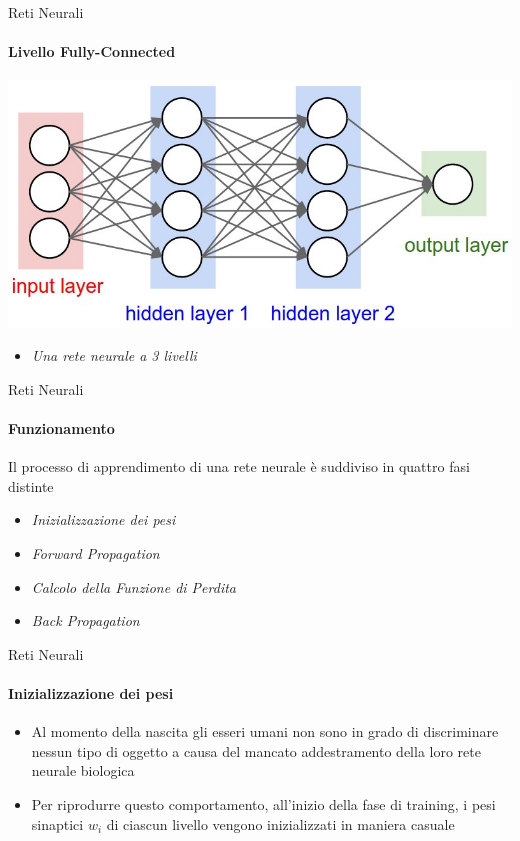 \documentclass[
 ]{beamer}
\begin{document}
\begin{frame}{Reti Neurali}
    \framesubtitle{Livello Fully-Connected}
    
    \begin{center}
      \includegraphics[scale = 0.35]{fully_connected.jpeg}
    \end{center}
  
    \bigskip
  
    \begin{itemize}
        \setlength\itemsep{1em}
        \item[] \large \emph{Una rete neurale a 3 livelli}
    \end{itemize}       
\end{frame} 



\begin{frame}{Reti Neurali}
    \framesubtitle{Funzionamento}
    
    Il processo di apprendimento di una rete neurale è suddiviso in quattro fasi distinte \pause
    
    \bigskip
    \bigskip
    
    \begin{itemize} [<+->]
        \setlength\itemsep{2em}
        \item \emph{\large Inizializzazione dei pesi}
        \item \emph{\large Forward Propagation}
        \item \emph{\large Calcolo della Funzione di Perdita}
        \item \emph{\large Back Propagation}
    \end{itemize}
\end{frame}

\begin{frame}{Reti Neurali}
    \framesubtitle{Inizializzazione dei pesi}
    
    \smallskip
    
    \begin{itemize} [<+->]
        \setlength\itemsep{3em}
        \item \large Al momento della nascita gli esseri umani non sono in grado di discriminare nessun tipo di oggetto a causa del mancato addestramento della loro rete neurale biologica
        \item \large Per riprodurre questo comportamento, all'inizio della fase di training, i pesi sinaptici $w_i$ di ciascun livello vengono inizializzati in maniera casuale     
    \end{itemize}
\end{frame}
\end{document}
